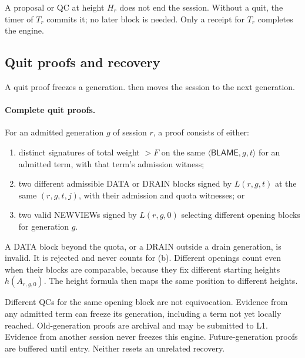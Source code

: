 \documentclass[11pt,a4paper]{article}
\newcommand{\RR}[1]{{\color{rrRed}#1}}
\newcommand{\tagg}[1]{\ensuremath{\mathsf{#1}}}
\begin{document}
A proposal or QC at height $H_r$ does not end the session. Without a
quit, the timer of $T_r$ commits it; no later block is needed. Only a
receipt for $T_r$ completes the engine.

\subsection{Quit proofs and recovery}
\label{sec:quit}
A quit proof freezes a generation.  then moves the
session to the next generation.

\paragraph{Complete quit proofs.}
For an admitted generation $g$ \RR{of session $r$}, a proof consists of
either:
\begin{enumerate}[label=(\alph*)]
\item distinct signatures \RR{of total weight $>F$} on the same
$\langle\tagg{BLAME},g,t\rangle$ for an admitted term, with that term's
admission witness;
\item two different admissible DATA \RR{or DRAIN} blocks signed by
$L(r,g,t)$ at the same $(r,g,t,j)$, with their admission \RR{and quota}
witnesses; or
\item two valid NEWVIEWs signed by $L(r,g,0)$ selecting different opening
blocks for generation $g$.
\end{enumerate}
\RR{A DATA block beyond the quota, or a DRAIN outside a drain generation,
is invalid. It is rejected and never counts for (b).}
Different openings count even when their blocks are comparable, because
they fix different starting heights $h(A_{r,g,0})$. The height formula then
maps the same position to different heights.

Different QCs for the same opening block are not equivocation. Evidence
from any admitted term can freeze its generation, including a term not
yet locally reached. Old-generation proofs are archival and may be
submitted to L1. \RR{Evidence from another session never freezes this
engine.} Future-generation proofs are buffered until entry. Neither
resets an unrelated recovery.
\end{document}
